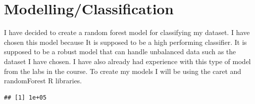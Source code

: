\documentclass{article}\usepackage[]{graphicx}\usepackage[]{color}
\makeatletter
\newenvironment{kframe}{%
 \def\at@end@of@kframe{}%
 \ifinner\ifhmode%
  \def\at@end@of@kframe{\end{minipage}}%
  \begin{minipage}{\columnwidth}%
 \fi\fi%
 \def\FrameCommand##1{\hskip\@totalleftmargin \hskip-\fboxsep
 \colorbox{shadecolor}{##1}\hskip-\fboxsep
     \hskip-\linewidth \hskip-\@totalleftmargin \hskip\columnwidth}%
 \MakeFramed {\advance\hsize-\width
   \@totalleftmargin\z@ \linewidth\hsize
   \@setminipage}}%
 {\par\unskip\endMakeFramed%
 \at@end@of@kframe}
\newenvironment{knitrout}{}{} %
\makeatother
\begin{document}
\section{Modelling/Classification}
I have decided to create a random forest model for classifying my dataset. I have chosen this model because It is supposed to be a high performing classifier. It is supposed to be a robust model that can handle unbalanced data such as the dataset I have chosen. I have also already had experience with this type of model from the labs in the course. To create my models I will be using the caret and randomForest R libraries. 
\begin{knitrout}
\color{fgcolor}\begin{kframe}
\begin{verbatim}
## [1] 1e+05
\end{verbatim}
\end{kframe}
\end{knitrout}
\end{document}
